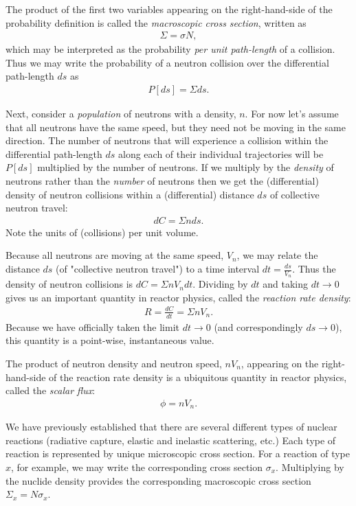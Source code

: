 \documentclass[11pt]{article}
\begin{document}
The product of the first two variables appearing on the right-hand-side of the probability definition is called the \emph{macroscopic cross section}, written as
\begin{align*}
  \Sigma = \sigma N,
\end{align*}
which may be interpreted as the probability \emph{per unit path-length} of a collision.  Thus we may write the probability of a neutron collision over the differential path-length \(ds\) as
\begin{align*}
  P[ds] = \Sigma ds.
\end{align*}

Next, consider a \emph{population} of neutrons with a density, \(n\).  For now let's assume that all neutrons have the same speed, but they need not be moving in the same direction.  The number of neutrons that will experience a collision within the differential path-length \(ds\) along each of their individual trajectories will be \(P[ds]\) multiplied by the number of neutrons.  If we multiply by the \emph{density} of neutrons rather than the \emph{number} of neutrons then we get the (differential) density of neutron collisions within a (differential) distance \(ds\) of collective neutron travel:
\begin{align*}
  dC = \Sigma n ds.
\end{align*}
Note the units of (collisions) per unit volume.

Because all neutrons are moving at the same speed, \(V_n\), we may relate the distance \(ds\) (of "collective neutron travel") to a time interval \(dt = \frac{ds}{V_n}\).  Thus the density of neutron collisions is \(dC = \Sigma n V_n dt\).  Dividing by \(dt\) and taking \(dt \rightarrow 0\) gives us an important quantity in reactor physics, called the \emph{reaction rate density}:
\begin{align*}
  R = \frac{dC}{dt} = \Sigma n V_n.
\end{align*}
Because we have officially taken the limit \(dt \rightarrow 0\) (and correspondingly \(ds \rightarrow 0\)), this quantity is a point-wise, instantaneous value.

The product of neutron density and neutron speed, \(n V_n\), appearing on the right-hand-side of the reaction rate density is a ubiquitous quantity in reactor physics, called the \emph{scalar flux}:
\begin{align*}
  \phi = n V_n.
\end{align*}

We have previously established that there are several different types of nuclear reactions (radiative capture, elastic and inelastic scattering, etc.)  Each type of reaction is represented by unique microscopic cross section.  For a reaction of type \(x\), for example, we may write the corresponding cross section \(\sigma_x\).  Multiplying by the nuclide density provides the corresponding macroscopic cross section \(\Sigma_x = N \sigma_x\).
\end{document}
